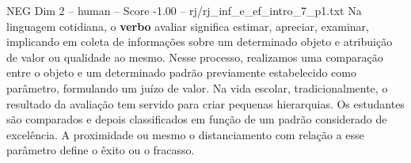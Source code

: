 \begin{textsample}{NEG Dim 2 – human – Score -1.00 – rj/rj\_inf\_e\_ef\_intro\_7\_p1.txt}  \label{ex:f2_neg_012}
Na linguagem cotidiana, o \textbf{verbo} avaliar significa estimar, apreciar, examinar, implicando em coleta de informações sobre um determinado objeto e atribuição de valor ou qualidade ao mesmo.
Nesse processo, realizamos uma comparação entre o objeto e um determinado padrão previamente estabelecido como parâmetro, formulando um juízo de valor.
Na vida escolar, tradicionalmente, o resultado da avaliação tem servido para criar pequenas hierarquias.
Os estudantes são comparados e depois classificados em função de um padrão considerado de excelência.
A proximidade ou mesmo o distanciamento com relação a esse parâmetro define o êxito ou o fracasso.

\end{textsample}
